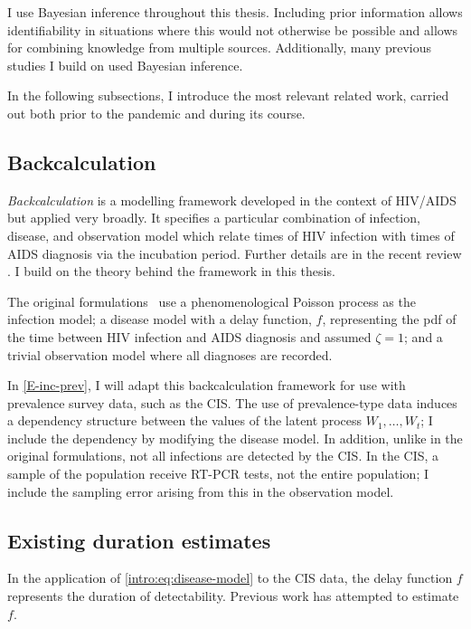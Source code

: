 \documentclass[thesis.tex]{subfiles}
\begin{document}
I use Bayesian inference throughout this thesis.
Including prior information allows identifiability in situations where this would not otherwise be possible and allows for combining knowledge from multiple sources.
Additionally, many previous studies I build on used Bayesian inference.

In the following subsections, I introduce the most relevant related work, carried out both prior to the pandemic and during its course.

\subsection{Backcalculation}

\emph{Backcalculation} is a modelling framework developed in the context of HIV/AIDS~\autocite{brookmeyerMethod} but applied very broadly.
It specifies a particular combination of infection, disease, and observation model which relate times of HIV infection with times of AIDS diagnosis via the incubation period.
Further details are in the recent review \textcite{sunModeling}.
I build on the theory behind the framework in this thesis.

The original formulations~\autocite{brookmeyerMethod,rosenbergBackcalculation} use a phenomenological Poisson process as the infection model; a disease model with a delay function, $f$, representing the pdf of the time between HIV infection and AIDS diagnosis and assumed $\zeta=1$; and a trivial observation model where all diagnoses are recorded.

In \cref{E-inc-prev}, I will adapt this backcalculation framework for use with prevalence survey data, such as the CIS.
The use of prevalence-type data induces a dependency structure between the values of the latent process $W_1, \dots, W_t$; I include the dependency by modifying the disease model.
In addition, unlike in the original formulations, not all infections are detected by the CIS.
In the CIS, a sample of the population receive RT-PCR tests, not the entire population; I include the sampling error arising from this in the observation model.

\subsection{Existing duration estimates} \label{intro:sec:previous-duration-estimates}

In the application of \cref{intro:eq:disease-model} to the CIS data, the delay function $f$ represents the duration of detectability.
Previous work has attempted to estimate $f$.
\end{document}

